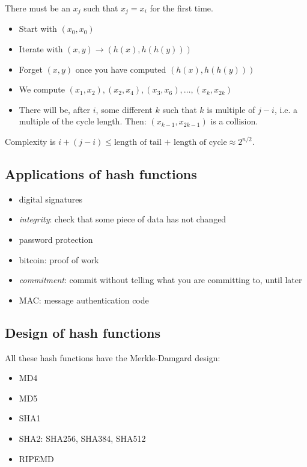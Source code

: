 \documentclass[language=english,number=]{homework}
\begin{document}
    There must be an $x_j$ such that $x_{j} = x_i$ for the first time.
    \begin{itemize}
        \item Start with $(x_0, x_0)$
        \item Iterate with $(x,y) \to (h(x), h(h(y)))$
        \item Forget $(x,y)$ once you have computed $(h(x), h(h(y)))$
        \item We compute $(x_1, x_2), (x_2, x_4), (x_3, x_6), \dots, (x_k, x_{2k})$
        \item There will be, after $i$, some different $k$ such that $k$ is multiple of $j-i$, i.e. a multiple of the cycle length.
        Then: $(x_{k-1}, x_{2k-1})$ is a collision.
    \end{itemize}

    Complexity is $i + (j-i) \le \text{length of tail + length of cycle} \approx 2^{n/2}$.

    \subsection{Applications of hash functions}

    \begin{itemize}
        \item digital signatures
        \item \textit{integrity}: check that some piece of data has not changed
        \item password protection
        \item bitcoin: proof of work
        \item \textit{commitment}: commit without telling what you are committing to, until later
        \item MAC: message authentication code
    \end{itemize}

    \subsection{Design of hash functions}

    All these hash functions have the Merkle-Damgard design:
    \begin{itemize}
        \item MD4
        \item MD5
        \item SHA1
        \item SHA2: SHA256, SHA384, SHA512
        \item RIPEMD
    \end{itemize}
\end{document}
